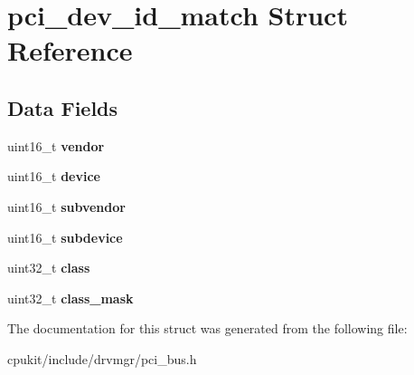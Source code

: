 \hypertarget{structpci__dev__id__match}{}\section{pci\+\_\+dev\+\_\+id\+\_\+match Struct Reference}
\label{structpci__dev__id__match}
\subsection*{Data Fields}
\begin{DoxyCompactItemize}
\item 
\mbox{\label{structpci__dev__id__match_a59fdb320a935f3e3ade54e1da9ca3089}} 
uint16\+\_\+t {\bfseries vendor}
\item 
\mbox{\label{structpci__dev__id__match_a59fe7bbb483fce8289e8b836e9e078be}} 
uint16\+\_\+t {\bfseries device}
\item 
\mbox{\label{structpci__dev__id__match_a9106a6ecd05d23050d512d08485b7121}} 
uint16\+\_\+t {\bfseries subvendor}
\item 
\mbox{\label{structpci__dev__id__match_a762a1cdc44b03f407f3160260af06bee}} 
uint16\+\_\+t {\bfseries subdevice}
\item 
\mbox{\label{structpci__dev__id__match_a5247792a248cc8c79c05ef587009c75f}} 
uint32\+\_\+t {\bfseries class}
\item 
\mbox{\label{structpci__dev__id__match_a3574a75112d6fa8bec5d39494178186e}} 
uint32\+\_\+t {\bfseries class\+\_\+mask}
\end{DoxyCompactItemize}


The documentation for this struct was generated from the following file\+:\begin{DoxyCompactItemize}
\item 
cpukit/include/drvmgr/pci\+\_\+bus.\+h\end{DoxyCompactItemize}
